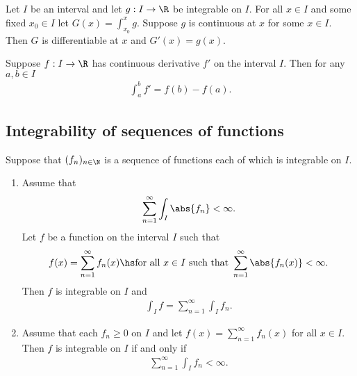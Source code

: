 \documentclass{article}
\begin{document}
\begin{theorem}[Notes 4.10]
    Let $I$ be an interval and let $g:I\to\R$ be integrable on $I$. For all $x\in I$ and
    some fixed $x_0\in I$ let $G(x) = \int_{x_0}^x g$. Suppose $g$ is continuous at $x$
    for some $x\in I$. Then $G$ is differentiable at $x$ and $G'(x)=g(x)$.
\end{theorem}

\begin{theorem}[Notes 4.11]
    Suppose $f:I\to\R$ has continuous derivative $f'$ on the interval $I$. Then for any
    $a,b\in I$
    \begin{align*}
        \int_a^b f' = f(b) - f(a).
    \end{align*}
\end{theorem}

\subsection{Integrability of sequences of functions}

\begin{theorem}[Notes 4.3]
    Suppose that $(f_n)_{n\in\N}$ is a sequence of functions each of which is integrable on $I$.
    \begin{enumerate}
        \item Assume that \begin{align*}
                  \sum_{n=1}^\infty \int_I \abs{f_n} < \infty.
              \end{align*}
              Let $f$ be a function on the interval $I$ such that \begin{align*}
                  f(x) = \sum_{n=1}^\infty f_n(x)\hs\text{for all $x\in I$ such that }\sum_{n=1}^\infty \abs{f_n(x)}<\infty.
              \end{align*}
              Then $f$ is integrable on $I$ and \begin{align*}
                  \int_I f = \sum_{n=1}^\infty \int_I f_n.
              \end{align*}
        \item Assume that each $f_n\geq 0$ on $I$ and let $f(x)=\sum_{n=1}^\infty f_n(x)$ for all $x\in I$. Then $f$
              is integrable on $I$ if and only if \begin{align*}
                  \sum_{n=1}^\infty \int_I f_n < \infty.
              \end{align*}
    \end{enumerate}
\end{theorem}
\end{document}
